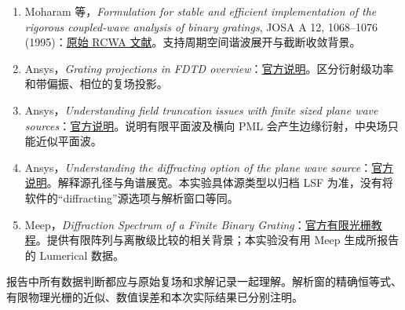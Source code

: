 \documentclass[
  chinese,
  UTF8,
  a4paper,
  11pt]{ctexart}
\providecommand{\tightlist}{%
  \setlength{\itemsep}{0pt}\setlength{\parskip}{0pt}}
\begin{document}
\begin{enumerate}
\def\labelenumi{\arabic{enumi}.}
\tightlist
\item
  Moharam 等，\emph{Formulation for stable and efficient implementation
  of the rigorous coupled-wave analysis of binary gratings}, JOSA A 12,
  1068--1076
  (1995)：\href{https://opg.optica.org/josaa/abstract.cfm?uri=josaa-12-5-1068}{原始
  RCWA 文献}。支持周期空间谐波展开与截断收敛背景。
\item
  Ansys，\emph{Grating projections in FDTD
  overview}：\href{https://optics.ansys.com/hc/en-us/articles/360034394354-Grating-projections-in-FDTD-overview}{官方说明}。区分衍射级功率和带偏振、相位的复场投影。
\item
  Ansys，\emph{Understanding field truncation issues with finite sized
  plane wave
  sources}：\href{https://optics.ansys.com/hc/en-us/articles/360034382874-Understanding-field-truncation-issues-with-finite-sized-plane-wave-sources}{官方说明}。说明有限平面波及横向
  PML 会产生边缘衍射，中央场只能近似平面波。
\item
  Ansys，\emph{Understanding the diffracting option of the plane wave
  source}：\href{https://optics.ansys.com/hc/en-us/articles/360034382914-Understanding-the-diffracting-option-of-the-plane-wave-source}{官方说明}。解释源孔径与角谱展宽。本实验具体源类型以归档
  LSF 为准，没有将软件的``diffracting''源选项与解析窗口等同。
\item
  Meep，\emph{Diffraction Spectrum of a Finite Binary
  Grating}：\href{https://meep.readthedocs.io/en/latest/Python_Tutorials/Near_to_Far_Field_Spectra/\#diffraction-spectrum-of-a-finite-binary-grating}{官方有限光栅教程}。提供有限阵列与离散级比较的相关背景；本实验没有用
  Meep 生成所报告的 Lumerical 数据。
\end{enumerate}

报告中所有数据判断都应与原始复场和求解记录一起理解。解析窗的精确恒等式、有限物理光栅的近似、数值误差和本次实际结果已分别注明。
\end{document}
